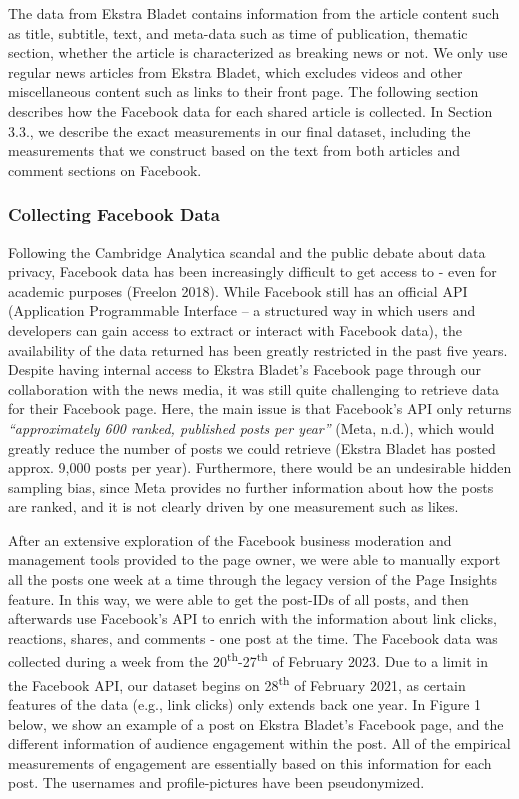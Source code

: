 \documentclass[
]{article}
\begin{document}
The data from Ekstra Bladet contains information from the article
content such as title, subtitle, text, and meta-data such as time of
publication, thematic section, whether the article is characterized as
breaking news or not. We only use regular news articles from Ekstra
Bladet, which excludes videos and other miscellaneous content such as
links to their front page. The following section describes how the
Facebook data for each shared article is collected. In Section 3.3., we
describe the exact measurements in our final dataset, including the
measurements that we construct based on the text from both articles and
comment sections on Facebook.

\hypertarget{collecting-facebook-data}{%
\subsubsection{Collecting Facebook
Data}\label{collecting-facebook-data}}

\noindent Following the Cambridge Analytica scandal and the public
debate about data privacy, Facebook data has been increasingly difficult
to get access to - even for academic purposes (Freelon 2018). While
Facebook still has an official API (Application Programmable Interface
-- a structured way in which users and developers can gain access to
extract or interact with Facebook data), the availability of the data
returned has been greatly restricted in the past five years. Despite
having internal access to Ekstra Bladet's Facebook page through our
collaboration with the news media, it was still quite challenging to
retrieve data for their Facebook page. Here, the main issue is that
Facebook's API only returns \emph{``approximately 600 ranked, published
posts per year''} (Meta, n.d.), which would greatly reduce the number of
posts we could retrieve (Ekstra Bladet has posted approx. 9,000 posts
per year). Furthermore, there would be an undesirable hidden sampling
bias, since Meta provides no further information about how the posts are
ranked, and it is not clearly driven by one measurement such as likes.

After an extensive exploration of the Facebook business moderation and
management tools provided to the page owner, we were able to manually
export all the posts one week at a time through the legacy version of
the Page Insights feature. In this way, we were able to get the post-IDs
of all posts, and then afterwards use Facebook's API to enrich with the
information about link clicks, reactions, shares, and comments - one
post at the time. The Facebook data was collected during a week from the
20\textsuperscript{th}-27\textsuperscript{th} of February 2023. Due to a
limit in the Facebook API, our dataset begins on 28\textsuperscript{th}
of February 2021, as certain features of the data (e.g., link clicks)
only extends back one year. In Figure 1 below, we show an example of a
post on Ekstra Bladet's Facebook page, and the different information of
audience engagement within the post. All of the empirical measurements
of engagement are essentially based on this information for each post.
The usernames and profile-pictures have been pseudonymized.
\end{document}

